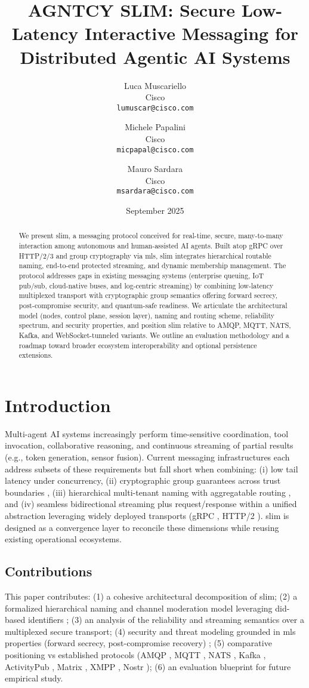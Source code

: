 \documentclass{article}
\title{AGNTCY SLIM: Secure Low-Latency Interactive Messaging for Distributed Agentic AI Systems}
\author{Luca Muscariello \\ Cisco \\ \texttt{lumuscar@cisco.com}
  \and Michele Papalini \\ Cisco \\ \texttt{micpapal@cisco.com}
  \and Mauro Sardara \\ Cisco \\ \texttt{msardara@cisco.com}}
\date{September 2025}
\newcommand{\HTTP}{HTTP/2\slash3}
\theoremstyle{definition}
\theoremstyle{remark}
\begin{document}
\maketitle
\begin{abstract}
We present \gls{slim}, a messaging protocol conceived for real-time, secure,
many-to-many interaction among autonomous and human-assisted AI agents. Built
atop gRPC over \HTTP{} and group cryptography via \gls{mls}, \gls{slim}
integrates hierarchical routable naming, end-to-end protected streaming, and
dynamic membership management. The protocol addresses gaps in existing
messaging systems (enterprise queuing, IoT pub/sub, cloud-native buses, and
log-centric streaming) by combining low-latency multiplexed transport with
cryptographic group semantics offering forward secrecy, post-compromise
security, and quantum-safe readiness. We articulate the architectural model
(nodes, control plane, session layer), naming and routing scheme, reliability
spectrum, and security properties, and position \gls{slim} relative to AMQP,
MQTT, NATS, Kafka, and WebSocket-tunneled variants. We outline an evaluation
methodology and a roadmap toward broader ecosystem interoperability and
optional persistence extensions.
\end{abstract}


\section{Introduction}\label{sec:intro}
Multi-agent AI systems increasingly perform time-sensitive coordination, tool
invocation, collaborative reasoning, and continuous streaming of partial
results (e.g., token generation, sensor fusion). Current messaging
infrastructures each address subsets of these requirements but fall short when
combining: (i) low tail latency under concurrency, (ii) cryptographic group
guarantees across trust boundaries \citep{rfc9420,rfc9750}, (iii) hierarchical
multi-tenant naming with aggregatable routing \citep{rfc6920,didcore}, and
(iv) seamless bidirectional streaming plus request/response within a unified
abstraction leveraging widely deployed transports (gRPC \citep{grpc}, HTTP/2
\citep{http2}). \gls{slim} is designed as a convergence layer to reconcile
these dimensions while reusing existing operational ecosystems.

\subsection{Contributions}
This paper contributes: (1) a cohesive architectural decomposition of
\gls{slim}; (2) a formalized hierarchical naming and channel moderation model
leveraging \gls{did}-based identifiers \citep{didcore,didmethods,didkey}; (3)
an analysis of the reliability and streaming semantics over a multiplexed
secure transport; (4) security and threat modeling grounded in \gls{mls}
properties (forward secrecy, post-compromise recovery)
\citep{rfc9420,rfc9750}; (5) comparative positioning vs established protocols
(AMQP \citep{amqp10}, MQTT \citep{mqtt311}, NATS \citep{nats}, Kafka
\citep{kafka}, ActivityPub \citep{activitypub}, Matrix \citep{matrixspec},
XMPP \citep{xmpp-core}, Nostr \citep{nostr}); (6) an evaluation blueprint for
future empirical study.
\end{document}
